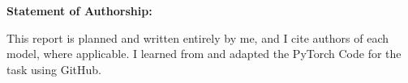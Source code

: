  
 
\textbf{Statement of Authorship: }

This report is planned and written entirely by me, and I cite authors of each model, where applicable. I learned from and adapted the PyTorch Code for the task using GitHub. 






